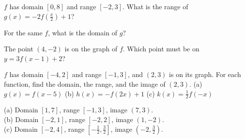 \begin{exo}{}
$f$ has domain $[0,8]$ and range $[-2,3]$. What is the range of $g(x)=-2f\!\left(\frac{x}{2}\right)+1$?
\choices{$[-5,5]$}{$[-3,7]$}{$[-4,6]$}{$[-1,3]$}
\end{exo}
\begin{exo}{}
For the same $f$, what is the domain of $g$?
\choices{$[0,4]$}{$[0,16]$}{$[-2,6]$}{$[0,8]$}
\end{exo}
\begin{exo}{}
The point $(4,-2)$ is on the graph of $f$. Which point must be on $y=3f(x-1)+2$?
\end{exo}
\begin{exo}{}
$f$ has domain $[-4,2]$ and range $[-1,3]$, and $(2,3)$ is on its graph. For each function, find the domain, the range, and the image of $(2,3)$.
(a) $g(x)=f(x-5)$ \quad (b) $h(x)=-f(2x)+1$ \quad (c) $k(x)=\frac12f(-x)$
\begin{solution}
(a) Domain $[1,7]$, range $[-1,3]$, image $(7,3)$.\\
(b) Domain $[-2,1]$, range $[-2,2]$, image $(1,-2)$.\\
(c) Domain $[-2,4]$, range $\left[-\frac12,\frac32\right]$, image $\left(-2,\frac32\right)$.
\end{solution}
\end{exo}

